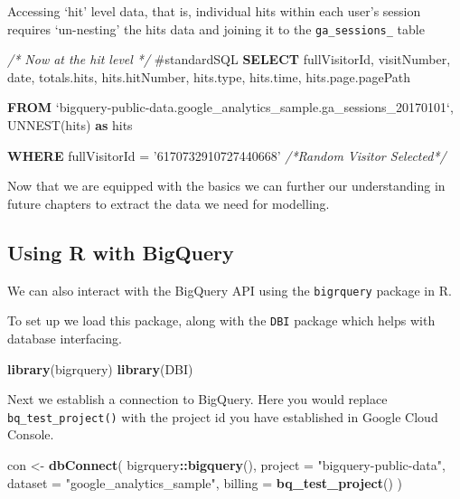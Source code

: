 \documentclass[]{book}
\newenvironment{Shaded}{\begin{snugshade}}{\end{snugshade}}
\newcommand{\KeywordTok}[1]{\textcolor[rgb]{0.13,0.29,0.53}{\textbf{#1}}}
\newcommand{\DataTypeTok}[1]{\textcolor[rgb]{0.13,0.29,0.53}{#1}}
\newcommand{\StringTok}[1]{\textcolor[rgb]{0.31,0.60,0.02}{#1}}
\newcommand{\CommentTok}[1]{\textcolor[rgb]{0.56,0.35,0.01}{\textit{#1}}}
\newcommand{\OperatorTok}[1]{\textcolor[rgb]{0.81,0.36,0.00}{\textbf{#1}}}
\newcommand{\NormalTok}[1]{#1}
\begin{document}
Accessing `hit' level data, that is, individual hits within each user's
session requires `un-nesting' the hits data and joining it to the
\texttt{ga\_sessions\_} table

\begin{Shaded}
\begin{Highlighting}[]
\CommentTok{/* Now at the hit level */}
\NormalTok{#standardSQL}
\KeywordTok{SELECT}\NormalTok{  fullVisitorId,  }
\NormalTok{        visitNumber, }
        \DataTypeTok{date}\NormalTok{, }
\NormalTok{        totals.hits, }
\NormalTok{        hits.hitNumber, }
\NormalTok{        hits.type, }
\NormalTok{        hits.time, }
\NormalTok{        hits.page.pagePath}
        
\KeywordTok{FROM}\NormalTok{ `bigquery-public-data.google_analytics_sample.ga_sessions_20170101`,}
\NormalTok{  UNNEST(hits) }\KeywordTok{as}\NormalTok{ hits}
  
\KeywordTok{WHERE}\NormalTok{ fullVisitorId = }\StringTok{'6170732910727440668'} \CommentTok{/*Random Visitor Selected*/}
\end{Highlighting}
\end{Shaded}

Now that we are equipped with the basics we can further our
understanding in future chapters to extract the data we need for
modelling.

\hypertarget{using-r-with-bigquery}{\subsection{Using R with
BigQuery}\label{using-r-with-bigquery}}

We can also interact with the BigQuery API using the \texttt{bigrquery}
package in R.

To set up we load this package, along with the \texttt{DBI} package
which helps with database interfacing.

\begin{Shaded}
\begin{Highlighting}[]
\KeywordTok{library}\NormalTok{(bigrquery)}
\KeywordTok{library}\NormalTok{(DBI)}
\end{Highlighting}
\end{Shaded}

Next we establish a connection to BigQuery. Here you would replace
\texttt{bq\_test\_project()} with the project id you have established in
Google Cloud Console.

\begin{Shaded}
\begin{Highlighting}[]
\NormalTok{con <-}\StringTok{ }\KeywordTok{dbConnect}\NormalTok{(}
\NormalTok{  bigrquery}\OperatorTok{::}\KeywordTok{bigquery}\NormalTok{(),}
  \DataTypeTok{project =} \StringTok{"bigquery-public-data"}\NormalTok{,}
  \DataTypeTok{dataset =} \StringTok{"google_analytics_sample"}\NormalTok{,}
  \DataTypeTok{billing =} \KeywordTok{bq_test_project}\NormalTok{()}
\NormalTok{)}
\end{Highlighting}
\end{Shaded}
\end{document}
